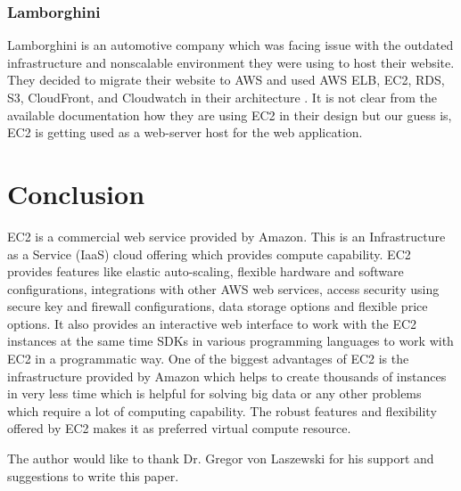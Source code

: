 \subsubsection{Lamborghini}
Lamborghini is an automotive company which was facing issue with the outdated infrastructure and nonscalable environment they were using to host their website. They decided to migrate their website to AWS and used AWS ELB, EC2, RDS, S3, CloudFront, and Cloudwatch in their architecture \cite{www-aws-ec2-lamborghini}. It is not clear from the available documentation how they are using EC2 in their design but our guess is, EC2 is getting used as a web-server host for the web application.

\section{Conclusion}
EC2 is a commercial web service provided by Amazon. This is an Infrastructure as a Service (IaaS) cloud offering which provides compute capability. EC2 provides features like elastic auto-scaling, flexible hardware and software configurations, integrations with other AWS web services, access security using secure key and firewall configurations, data storage options and flexible price options. It also provides an interactive web interface to work with the EC2 instances at the same time SDKs in various programming languages to work with EC2 in a programmatic way. One of the biggest advantages of EC2 is the infrastructure provided by Amazon which helps to create thousands of instances in very less time which is helpful for solving big data or any other problems which require a lot of computing capability. The robust features and flexibility offered by EC2 makes it as preferred virtual compute resource.

\begin{acks}

  The author would like to thank Dr. Gregor von Laszewski for his
  support and suggestions to write this paper.

\end{acks}


 
